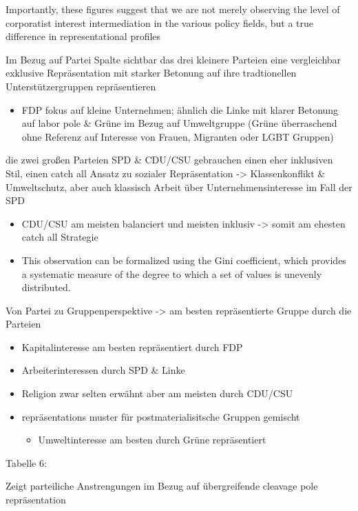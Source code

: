 \documentclass[11pt]{article}
\begin{document}
Importantly, these figures suggest that we are not merely observing the level of corporatist interest intermediation in the various policy fields, but a true difference in representational profiles

Im Bezug auf Partei Spalte sichtbar das drei kleinere Parteien eine vergleichbar exklusive Repräsentation mit starker Betonung auf ihre tradtionellen Unterstützergruppen repräsentieren 

\begin{itemize}
\item FDP fokus auf kleine Unternehmen; ähnlich die Linke mit klarer Betonung auf labor pole \& Grüne im Bezug auf Umweltgruppe (Grüne überraschend ohne Referenz auf Interesse von Frauen, Migranten oder LGBT Gruppen)
\end{itemize}

die zwei großen Parteien SPD \& CDU/CSU gebrauchen einen eher inklusiven Stil, einen catch all Ansatz zu sozialer Repräsentation -> Klassenkonflikt \& Umweltschutz, aber auch klassisch Arbeit über Unternehmensinteresse im Fall der SPD 

\begin{itemize}
\item CDU/CSU am meisten balanciert und meisten inklusiv -> somit am ehesten catch all Strategie
\item This observation can be formalized using the Gini coefficient, which provides a systematic measure of the degree to which a set of values is unevenly distributed.
\end{itemize}

Von Partei zu Gruppenperspektive -> am besten repräsentierte Gruppe durch die Parteien 

\begin{itemize}
\item Kapitalinteresse am besten repräsentiert durch FDP
\item Arbeiterinteressen durch SPD \& Linke
\item Religion zwar selten erwähnt aber am meisten durch CDU/CSU
\item repräsentations muster für postmaterialisitsche Gruppen gemischt 
\begin{itemize}
\item Umweltinteresse am besten durch Grüne repräsentiert
\end{itemize}
\end{itemize}

Tabelle 6: 

Zeigt parteiliche Anstrengungen im Bezug auf übergreifende cleavage pole repräsentation 
\end{document}
